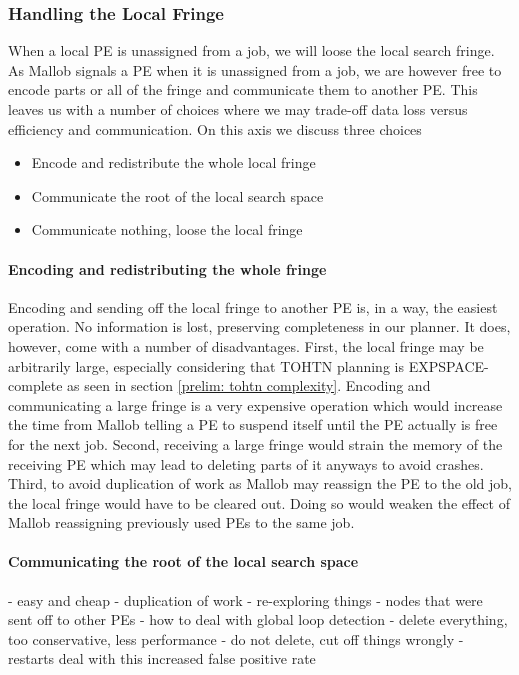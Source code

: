 \subsubsection{Handling the Local Fringe}
When a local PE is unassigned from a job, we will loose the local search fringe. As Mallob signals a PE when it is unassigned from a job, we are however free to encode parts or all of the fringe and communicate them to another PE. This leaves us with a number of choices where we may trade-off data loss versus efficiency and communication. On this axis we discuss three choices
\begin{itemize}
	\item Encode and redistribute the whole local fringe
	\item Communicate the root of the local search space
	\item Communicate nothing, loose the local fringe
\end{itemize}

\paragraph{Encoding and redistributing the whole fringe}
Encoding and sending off the local fringe to another PE is, in a way, the easiest operation. No information is lost, preserving completeness in our planner. It does, however, come with a number of disadvantages. First, the local fringe may be arbitrarily large, especially considering that TOHTN planning is EXPSPACE-complete as seen in section \ref{prelim: tohtn complexity}. Encoding and communicating a large fringe is a very expensive operation which would increase the time from Mallob telling a PE to suspend itself until the PE actually is free for the next job. Second, receiving a large fringe would strain the memory of the receiving PE which may lead to deleting parts of it anyways to avoid crashes. Third, to avoid duplication of work as Mallob may reassign the PE to the old job, the local fringe would have to be cleared out. Doing so would weaken the effect of Mallob reassigning previously used PEs to the same job.
\begin{comment}
- the most complete operation
- nothing is lost
- nodes higher up in the tree of PEs may be more strained now (depending on the communication pattern)
- a very expensive operation
- take care to delete the local fringe to avoid duplication!
\end{comment}

\paragraph{Communicating the root of the local search space}
- easy and cheap
- duplication of work
	- re-exploring things
	- nodes that were sent off to other PEs
- how to deal with global loop detection
	- delete everything, too conservative, less performance
	- do not delete, cut off things wrongly
		- restarts deal with this increased false positive rate

